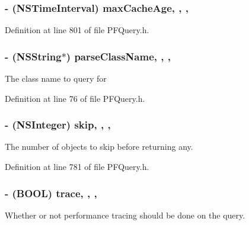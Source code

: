 \subsubsection[{max\+Cache\+Age}]{\setlength{\rightskip}{0pt plus 5cm}-\/ (N\+S\+Time\+Interval) max\+Cache\+Age\hspace{0.3cm}{\ttfamily [read]}, {\ttfamily [write]}, {\ttfamily [atomic]}, {\ttfamily [assign]}}\label{interface_p_f_query_a89e6f1c2e8ce45422b7a08fac4c36f24}


Definition at line 801 of file P\+F\+Query.\+h.

\hypertarget{interface_p_f_query_afba0f4baaf28a4b871fe5b9d5dc3604c}{}
\subsubsection[{parse\+Class\+Name}]{\setlength{\rightskip}{0pt plus 5cm}-\/ (N\+S\+String$\ast$) parse\+Class\+Name\hspace{0.3cm}{\ttfamily [read]}, {\ttfamily [write]}, {\ttfamily [nonatomic]}, {\ttfamily [strong]}}\label{interface_p_f_query_afba0f4baaf28a4b871fe5b9d5dc3604c}
The class name to query for 

Definition at line 76 of file P\+F\+Query.\+h.

\hypertarget{interface_p_f_query_a2b5deec7ffc434a4c787f5aa0471ddcd}{}
\subsubsection[{skip}]{\setlength{\rightskip}{0pt plus 5cm}-\/ (N\+S\+Integer) skip\hspace{0.3cm}{\ttfamily [read]}, {\ttfamily [write]}, {\ttfamily [nonatomic]}, {\ttfamily [assign]}}\label{interface_p_f_query_a2b5deec7ffc434a4c787f5aa0471ddcd}
The number of objects to skip before returning any. 

Definition at line 781 of file P\+F\+Query.\+h.

\hypertarget{interface_p_f_query_a86849de3551a7ea56c652f55f48bfe47}{}
\subsubsection[{trace}]{\setlength{\rightskip}{0pt plus 5cm}-\/ (B\+O\+O\+L) trace\hspace{0.3cm}{\ttfamily [read]}, {\ttfamily [write]}, {\ttfamily [nonatomic]}, {\ttfamily [assign]}}\label{interface_p_f_query_a86849de3551a7ea56c652f55f48bfe47}
Whether or not performance tracing should be done on the query.

